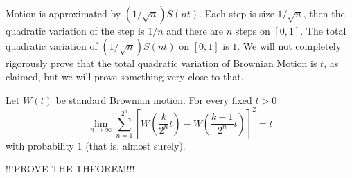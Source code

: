 \begin{solution}
\begin{solution}
\begin{solution}
\begin{solution}
\begin{solution}
\begin{solution}
\begin{solution}
\begin{solution}
\begin{solution}
\begin{solution}
{\begin{problem}
  Motion is approximated by $(1/\sqrt{n}) S(nt)$.  Each step is size $1/\sqrt{n}$, 
  then the quadratic variation of the step is $1/n$ and there are $n$ steps on $[0,1]$.  
  The total quadratic variation of $(1/\sqrt{n})S(nt)$ on $[0,1]$ is $1$.
  We will not completely rigorously prove that the total quadratic variation of
  Brownian Motion is $t$, as claimed, but we will prove something very
  close to that.
  \begin{theorem}
  Let $W(t)$ be standard Brownian motion.  For every fixed $t > 0$
  \[
    \lim_{n \to \infty}
             \sum_{n=1}^{2^n} 
               \left[ 
                  W\left( \frac{k}{2^n} t \right) - 
                  W\left( \frac{k-1}{2^n} t \right)
               \right]^2
           = t
  \]
  \ni with probability $1$ (that is, almost surely).
  \end{theorem}
  !!!PROVE THE THEOREM!!!


\end{problem}}
\end{solution}
\end{solution}
\end{solution}
\end{solution}
\end{solution}
\end{solution}
\end{solution}
\end{solution}
\end{solution}
\end{solution}
